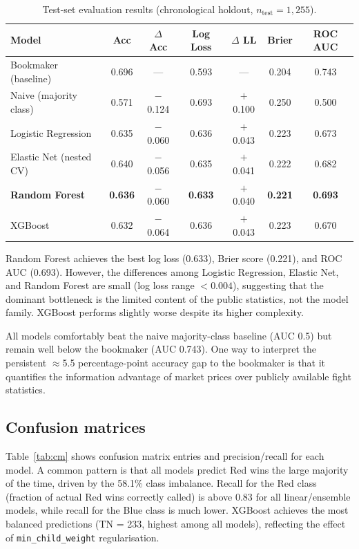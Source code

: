 \documentclass{article}
\begin{document}
\begin{table}[H]
\centering
\caption{Test-set evaluation results (chronological holdout, $n_{\text{test}} = 1{,}255$).}
\label{tab:results}
\begin{tabular}{lcccccc}
\toprule
Model & Acc & $\Delta$ Acc & Log Loss & $\Delta$ LL & Brier & ROC AUC \\
\midrule
Bookmaker (baseline)    & 0.696 & ---    & 0.593 & ---    & 0.204 & 0.743 \\
Naive (majority class)  & 0.571 & $-$0.124 & 0.693 & $+$0.100 & 0.250 & 0.500 \\
Logistic Regression     & 0.635 & $-$0.060 & 0.636 & $+$0.043 & 0.223 & 0.673 \\
Elastic Net (nested CV) & 0.640 & $-$0.056 & 0.635 & $+$0.041 & 0.222 & 0.682 \\
\textbf{Random Forest}  & \textbf{0.636} & $-$0.060 & \textbf{0.633} & $+$0.040 & \textbf{0.221} & \textbf{0.693} \\
XGBoost                 & 0.632 & $-$0.064 & 0.636 & $+$0.043 & 0.223 & 0.670 \\
\bottomrule
\end{tabular}
\end{table}

Random Forest achieves the best log loss (0.633), Brier score (0.221), and
ROC AUC (0.693).
However, the differences among Logistic Regression, Elastic Net, and Random
Forest are small (log loss range $< 0.004$), suggesting that the dominant
bottleneck is the limited content of the public statistics, not the
model family.
XGBoost performs slightly worse despite its higher complexity.

All models comfortably beat the naive majority-class baseline (AUC 0.5)
but remain well below the bookmaker (AUC 0.743).
One way to interpret the persistent $\approx$5.5 percentage-point accuracy gap
to the bookmaker is that it quantifies the information advantage of market 
prices over publicly available fight statistics.

\subsection{Confusion matrices}

Table~\ref{tab:cm} shows confusion matrix entries and precision/recall for
each model.
A common pattern is that all models predict Red wins the large majority
of the time, driven by the 58.1\% class imbalance.
Recall for the Red class (fraction of actual Red wins correctly called) is
above 0.83 for all linear/ensemble models, while recall for the Blue class
is much lower.
XGBoost achieves the most balanced predictions (TN = 233, highest among all
models), reflecting the effect of \texttt{min\_child\_weight} regularisation.
\end{document}
